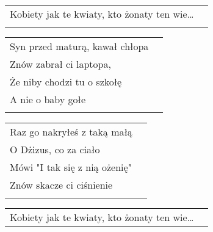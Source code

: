 \documentclass[a5paper]{article}
\begin{document}
\noindent
\begin{tabular}{@{}p{8.00cm}p{3cm}@{}}
Kobiety jak te kwiaty, kto żonaty ten wie…\\ \\
\end{tabular}

\noindent
\begin{tabular}{@{}p{8.00cm}p{3cm}@{}}
Syn przed maturą, kawał chłopa \\
Znów zabrał ci laptopa, \\
Że niby chodzi tu o szkołę \\ 
A nie o baby gołe \\ \\
\end{tabular}

\noindent
\begin{tabular}{@{}p{8.00cm}p{3cm}@{}}
Raz go nakryłeś z taką małą \\
O Dżizus, co za ciało \\
Mówi "I tak się z nią ożenię" \\
Znów skacze ci ciśnienie \\ \\
\end{tabular}

\noindent
\begin{tabular}{@{}p{8.00cm}p{3cm}@{}}
Kobiety jak te kwiaty, kto żonaty ten wie…
\end{tabular}
\end{document}
